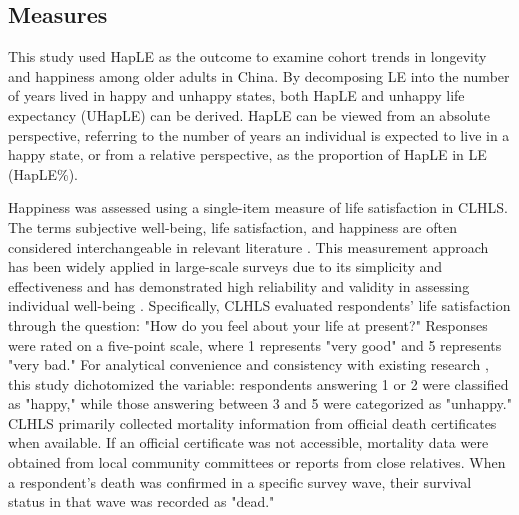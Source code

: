 \documentclass[12pt, a4paper]{article}
\begin{document}
\subsection{Measures}
This study used HapLE as the outcome to examine cohort trends in longevity and happiness among older adults in China. By decomposing LE into the number of years lived in happy and unhappy states, both HapLE and unhappy life expectancy (UHapLE) can be derived. HapLE can be viewed from an absolute perspective, referring to the number of years an individual is expected to live in a happy state, or from a relative perspective, as the proportion of HapLE in LE (HapLE\%).

Happiness was assessed using a single-item measure of life satisfaction in CLHLS. The terms subjective well-being, life satisfaction, and happiness are often considered interchangeable in relevant literature \autocite{easterlin.2021.growth,yang.2008.long}. This measurement approach has been widely applied in large-scale surveys due to its simplicity and effectiveness and has demonstrated high reliability and validity in assessing individual well-being \autocite{baur.1983.stability,lucas.2018.shortterm}. Specifically, CLHLS evaluated respondents' life satisfaction through the question: "How do you feel about your life at present?" Responses were rated on a five-point scale, where 1 represents "very good" and 5 represents "very bad." For analytical convenience and consistency with existing research \autocite{duan.2020.happy,wan.2024.socioeconomic}, this study dichotomized the variable: respondents answering 1 or 2 were classified as "happy," while those answering between 3 and 5 were categorized as "unhappy." CLHLS primarily collected mortality information from official death certificates when available. If an official certificate was not accessible, mortality data were obtained from local community committees or reports from close relatives. When a respondent's death was confirmed in a specific survey wave, their survival status in that wave was recorded as "dead."
\end{document}
